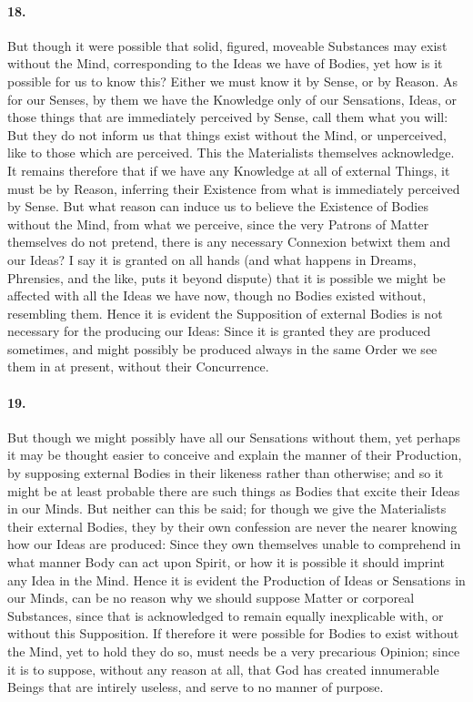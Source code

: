 \documentclass[]{article}
\newenvironment{sectionbody}{}{}
\begin{document}
\begin{sectionbody}
\paragraph{18.} But though it were possible that solid, figured, moveable
Substances may exist without the Mind, corresponding to the Ideas
we have of Bodies, yet how is it possible for us to know this?
Either we must know it by Sense, or by Reason.  As for our
Senses, by them we have the Knowledge only of our Sensations,
Ideas, or those things that are immediately perceived by Sense,
call them what you will: But they do not inform us that things
exist without the Mind, or unperceived, like to those which are
perceived.  This the Materialists themselves acknowledge.  It
remains therefore that if we have any Knowledge at all of
external Things, it must be by Reason, inferring their Existence
from what is immediately perceived by Sense.  But what reason can
induce us to believe the Existence of Bodies without the Mind,
from what we perceive, since the very Patrons of Matter
themselves do not pretend, there is any necessary Connexion
betwixt them and our Ideas? I say it is granted on all hands (and
what happens in Dreams, Phrensies, and the like, puts it beyond
dispute) that it is possible we might be affected with all the
Ideas we have now, though no Bodies existed without, resembling
them.  Hence it is evident the Supposition of external Bodies is
not necessary for the producing our Ideas: Since it is granted
they are produced sometimes, and might possibly be produced
always in the same Order we see them in at present, without their
Concurrence.



\paragraph{19.} But though we might possibly have all our Sensations without
them, yet perhaps it may be thought easier to conceive and
explain the manner of their Production, by supposing external
Bodies in their likeness rather than otherwise; and so it might
be at least probable there are such things as Bodies that excite
their Ideas in our Minds.  But neither can this be said; for
though we give the Materialists their external Bodies, they by
their own confession are never the nearer knowing how our Ideas
are produced: Since they own themselves unable to comprehend in
what manner Body can act upon Spirit, or how it is possible it
should imprint any Idea in the Mind.  Hence it is evident the
Production of Ideas or Sensations in our Minds, can be no reason
why we should suppose Matter or corporeal Substances, since that
is acknowledged to remain equally inexplicable with, or without
this Supposition.  If therefore it were possible for Bodies to
exist without the Mind, yet to hold they do so, must needs be a
very precarious Opinion; since it is to suppose, without any
reason at all, that God has created innumerable Beings that are
intirely useless, and serve to no manner of purpose.




\end{sectionbody}
\end{document}
